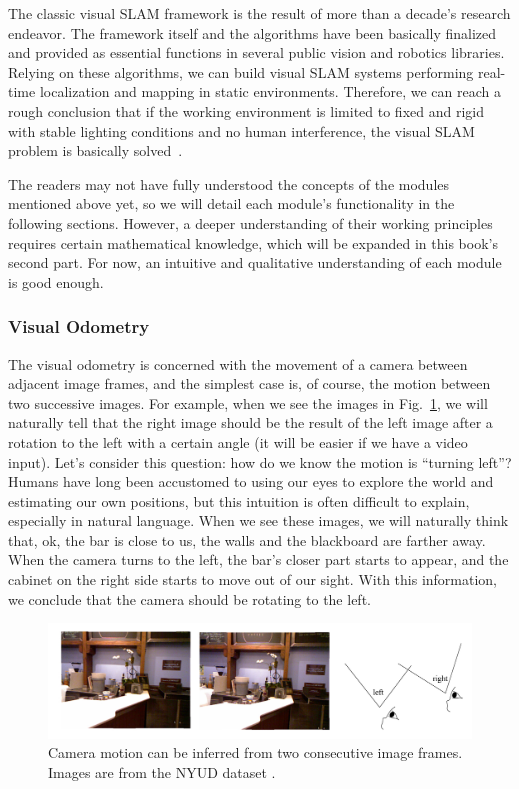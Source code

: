 The classic visual SLAM framework is the result of more than a decade's research endeavor. The framework itself and the algorithms have been basically finalized and provided as essential functions in several public vision and robotics libraries. Relying on these algorithms, we can build visual SLAM systems performing real-time localization and mapping in static environments. Therefore, we can reach a rough conclusion that if the working environment is limited to fixed and rigid with stable lighting conditions and no human interference, the visual SLAM problem is basically solved~\cite{Cadena2016}.

The readers may not have fully understood the concepts of the modules mentioned above yet, so we will detail each module's functionality in the following sections. However, a deeper understanding of their working principles requires certain mathematical knowledge, which will be expanded in this book's second part. For now, an intuitive and qualitative understanding of each module is good enough.

\subsubsection{Visual Odometry}

The visual odometry is concerned with the movement of a camera between adjacent image frames, and the simplest case is, of course, the motion between two successive images. For example, when we see the images in Fig.~\ref{fig:cameramotion}, we will naturally tell that the right image should be the result of the left image after a rotation to the left with a certain angle (it will be easier if we have a video input). Let's consider this question: how do we know the motion is ``turning left''? Humans have long been accustomed to using our eyes to explore the world and estimating our own positions, but this intuition is often difficult to explain, especially in natural language. When we see these images, we will naturally think that, ok, the bar is close to us, the walls and the blackboard are farther away. When the camera turns to the left, the bar's closer part starts to appear, and the cabinet on the right side starts to move out of our sight. With this information, we conclude that the camera should be rotating to the left.

\begin{figure}
    \centering
    \includegraphics[width=1.0\textwidth]{./resources/whatIsSLAM/cameramotion.pdf}
    \caption{Camera motion can be inferred from two consecutive image frames. Images are from the NYUD dataset \cite{Silberman2012}.}
    \label{fig:cameramotion}
\end{figure}

